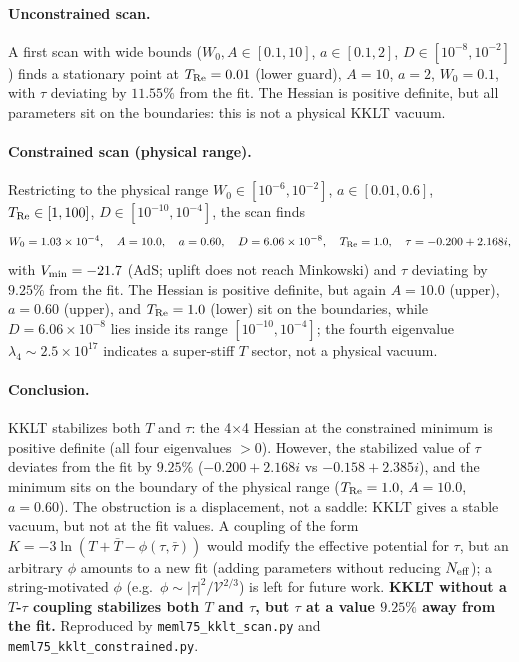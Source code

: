 \documentclass[12pt,a4paper]{article}
\numberwithin{equation}{section}
\begin{document}
\paragraph{Unconstrained scan.}
A first scan with wide bounds
(\(W_0, A \in [0.1, 10]\), \(a \in [0.1, 2]\), \(D \in [10^{-8}, 10^{-2}]\))
finds a stationary point at \(T_{\rm Re} = 0.01\) (lower guard),
\(A = 10\), \(a = 2\), \(W_0 = 0.1\), with \(\tau\) deviating by
\(11.55\%\) from the fit. The Hessian is positive definite, but all
parameters sit on the boundaries: this is not a physical KKLT vacuum.

\paragraph{Constrained scan (physical range).}
Restricting to the physical range \(W_0 \in [10^{-6},10^{-2}]\),
\(a \in [0.01,0.6]\), \(T_{\rm Re} \in [1,100]\),
\(D \in [10^{-10},10^{-4}]\), the scan finds
\begin{equation}
W_0 = 1.03\times10^{-4}, \quad A = 10.0, \quad a = 0.60, \quad
D = 6.06\times10^{-8}, \quad
T_{\rm Re} = 1.0, \quad \tau = -0.200+2.168i,
\end{equation}
with \(V_{\rm min} = -21.7\) (AdS; uplift does not reach Minkowski)
and \(\tau\) deviating by \(9.25\%\) from the fit. The Hessian is
positive definite, but again \(A = 10.0\) (upper), \(a = 0.60\)
(upper), and \(T_{\rm Re} = 1.0\) (lower) sit on the boundaries,
while \(D = 6.06\times10^{-8}\) lies inside its range
\([10^{-10}, 10^{-4}]\); the fourth eigenvalue
\(\lambda_4 \sim 2.5\times10^{17}\) indicates a super-stiff \(T\)
sector, not a physical vacuum.

\paragraph{Conclusion.}
KKLT stabilizes both \(T\) and \(\tau\): the 4\(\times\)4 Hessian at
the constrained minimum is positive definite (all four eigenvalues
\(>0\)). However, the stabilized value of \(\tau\) deviates from the
fit by \(9.25\%\) (\(-0.200+2.168i\) vs \(-0.158+2.385i\)), and the
minimum sits on the boundary of the physical range
(\(T_{\rm Re} = 1.0\), \(A = 10.0\), \(a = 0.60\)). The obstruction
is a displacement, not a saddle: KKLT gives a stable vacuum, but not
at the fit values. A coupling of the form
\(K = -3\ln(T+\bar T - \phi(\tau,\bar\tau))\) would modify the
effective potential for \(\tau\), but an arbitrary \(\phi\) amounts
to a new fit (adding parameters without reducing \(N_{\rm eff}\));
a string-motivated \(\phi\) (e.g.\
\(\phi \sim |\tau|^2/\mathcal{V}^{2/3}\)) is left for future work.
\textbf{KKLT without a \(T\)-\(\tau\) coupling stabilizes both \(T\)
and \(\tau\), but \(\tau\) at a value \(9.25\%\) away from the fit.}
Reproduced by \texttt{meml75\_kklt\_scan.py} and
\texttt{meml75\_kklt\_constrained.py}.
\end{document}
